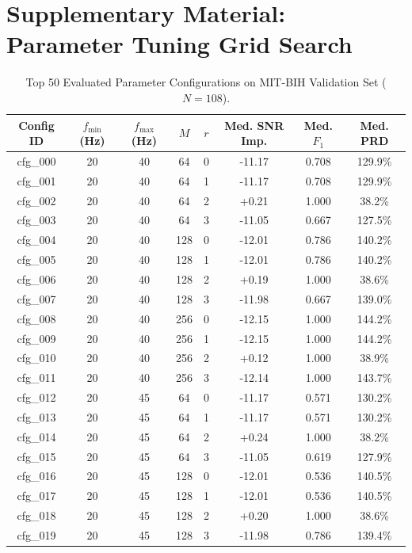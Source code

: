 \section*{Supplementary Material: Parameter Tuning Grid Search}
\begin{table}[h]
\centering
\caption{Top 50 Evaluated Parameter Configurations on MIT-BIH Validation Set ($N=108$).}
\begin{tabular}{cccccccc}
\hline
\textbf{Config ID} & \textbf{$f_{\text{min}}$ (Hz)} & \textbf{$f_{\text{max}}$ (Hz)} & \textbf{$M$} & \textbf{$r$} & \textbf{Med. SNR Imp.} & \textbf{Med. $F_1$} & \textbf{Med. PRD} \\
\hline
cfg_000 & 20 & 40 & 64 & 0 & -11.17 & 0.708 & 129.9\% \\
cfg_001 & 20 & 40 & 64 & 1 & -11.17 & 0.708 & 129.9\% \\
cfg_002 & 20 & 40 & 64 & 2 & +0.21 & 1.000 & 38.2\% \\
cfg_003 & 20 & 40 & 64 & 3 & -11.05 & 0.667 & 127.5\% \\
cfg_004 & 20 & 40 & 128 & 0 & -12.01 & 0.786 & 140.2\% \\
cfg_005 & 20 & 40 & 128 & 1 & -12.01 & 0.786 & 140.2\% \\
cfg_006 & 20 & 40 & 128 & 2 & +0.19 & 1.000 & 38.6\% \\
cfg_007 & 20 & 40 & 128 & 3 & -11.98 & 0.667 & 139.0\% \\
cfg_008 & 20 & 40 & 256 & 0 & -12.15 & 1.000 & 144.2\% \\
cfg_009 & 20 & 40 & 256 & 1 & -12.15 & 1.000 & 144.2\% \\
cfg_010 & 20 & 40 & 256 & 2 & +0.12 & 1.000 & 38.9\% \\
cfg_011 & 20 & 40 & 256 & 3 & -12.14 & 1.000 & 143.7\% \\
cfg_012 & 20 & 45 & 64 & 0 & -11.17 & 0.571 & 130.2\% \\
cfg_013 & 20 & 45 & 64 & 1 & -11.17 & 0.571 & 130.2\% \\
cfg_014 & 20 & 45 & 64 & 2 & +0.24 & 1.000 & 38.2\% \\
cfg_015 & 20 & 45 & 64 & 3 & -11.05 & 0.619 & 127.9\% \\
cfg_016 & 20 & 45 & 128 & 0 & -12.01 & 0.536 & 140.5\% \\
cfg_017 & 20 & 45 & 128 & 1 & -12.01 & 0.536 & 140.5\% \\
cfg_018 & 20 & 45 & 128 & 2 & +0.20 & 1.000 & 38.6\% \\
cfg_019 & 20 & 45 & 128 & 3 & -11.98 & 0.786 & 139.4\% \\

\end{tabular}
\end{table}
